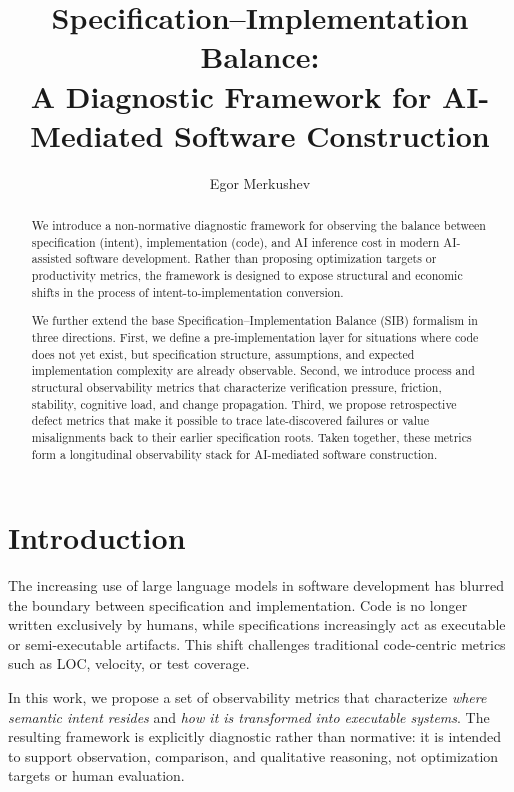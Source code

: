 \documentclass[twocolumn]{aastex701}
\begin{document}
\title{Specification--Implementation Balance:\\
A Diagnostic Framework for AI-Mediated Software Construction}

\author{Egor Merkushev}

\begin{abstract}
We introduce a non-normative diagnostic framework for observing the balance
between specification (intent), implementation (code), and AI inference cost
in modern AI-assisted software development.
Rather than proposing optimization targets or productivity metrics,
the framework is designed to expose structural and economic shifts
in the process of intent-to-implementation conversion.

We further extend the base Specification--Implementation Balance (SIB)
formalism in three directions.
First, we define a pre-implementation layer for situations where code
does not yet exist, but specification structure, assumptions, and expected
implementation complexity are already observable.
Second, we introduce process and structural observability metrics that
characterize verification pressure, friction, stability, cognitive load,
and change propagation.
Third, we propose retrospective defect metrics that make it possible
to trace late-discovered failures or value misalignments back to their
earlier specification roots.
Taken together, these metrics form a longitudinal observability stack
for AI-mediated software construction.
\end{abstract}


\section*{Introduction}

The increasing use of large language models in software development
has blurred the boundary between specification and implementation.
Code is no longer written exclusively by humans, while specifications
increasingly act as executable or semi-executable artifacts.
This shift challenges traditional code-centric metrics such as LOC,
velocity, or test coverage.

In this work, we propose a set of observability metrics that characterize
\emph{where semantic intent resides} and \emph{how it is transformed into
executable systems}.
The resulting framework is explicitly diagnostic rather than normative:
it is intended to support observation, comparison, and qualitative reasoning,
not optimization targets or human evaluation.
\end{document}
